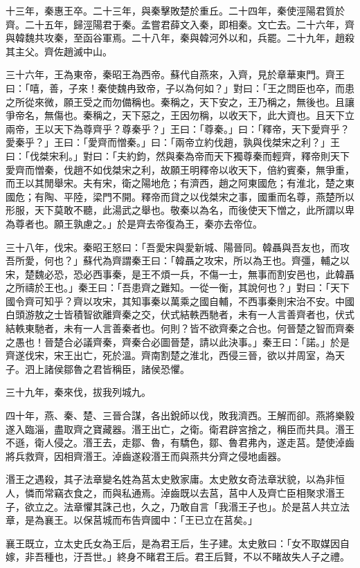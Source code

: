 \begin{pinyinscope}
十三年，秦惠王卒。二十三年，與秦擊敗楚於重丘。二十四年，秦使涇陽君質於齊。二十五年，歸涇陽君于秦。孟嘗君薛文入秦，即相秦。文亡去。二十六年，齊與韓魏共攻秦，至函谷軍焉。二十八年，秦與韓河外以和，兵罷。二十九年，趙殺其主父。齊佐趙滅中山。

三十六年，王為東帝，秦昭王為西帝。蘇代自燕來，入齊，見於章華東門。齊王曰：「嘻，善，子來！秦使魏冉致帝，子以為何如？」對曰：「王之問臣也卒，而患之所從來微，願王受之而勿備稱也。秦稱之，天下安之，王乃稱之，無後也。且讓爭帝名，無傷也。秦稱之，天下惡之，王因勿稱，以收天下，此大資也。且天下立兩帝，王以天下為尊齊乎？尊秦乎？」王曰：「尊秦。」曰：「釋帝，天下愛齊乎？愛秦乎？」王曰：「愛齊而憎秦。」曰：「兩帝立約伐趙，孰與伐桀宋之利？」王曰：「伐桀宋利。」對曰：「夫約鈞，然與秦為帝而天下獨尊秦而輕齊，釋帝則天下愛齊而憎秦，伐趙不如伐桀宋之利，故願王明釋帝以收天下，倍約賓秦，無爭重，而王以其閒舉宋。夫有宋，衛之陽地危；有濟西，趙之阿東國危；有淮北，楚之東國危；有陶、平陸，梁門不開。釋帝而貸之以伐桀宋之事，國重而名尊，燕楚所以形服，天下莫敢不聽，此湯武之舉也。敬秦以為名，而後使天下憎之，此所謂以卑為尊者也。願王孰慮之。」於是齊去帝復為王，秦亦去帝位。

三十八年，伐宋。秦昭王怒曰：「吾愛宋與愛新城、陽晉同。韓聶與吾友也，而攻吾所愛，何也？」蘇代為齊謂秦王曰：「韓聶之攻宋，所以為王也。齊彊，輔之以宋，楚魏必恐，恐必西事秦，是王不煩一兵，不傷一士，無事而割安邑也，此韓聶之所禱於王也。」秦王曰：「吾患齊之難知。一從一衡，其說何也？」對曰：「天下國令齊可知乎？齊以攻宋，其知事秦以萬乘之國自輔，不西事秦則宋治不安。中國白頭游敖之士皆積智欲離齊秦之交，伏式結軼西馳者，未有一人言善齊者也，伏式結軼東馳者，未有一人言善秦者也。何則？皆不欲齊秦之合也。何晉楚之智而齊秦之愚也！晉楚合必議齊秦，齊秦合必圖晉楚，請以此決事。」秦王曰：「諾。」於是齊遂伐宋，宋王出亡，死於溫。齊南割楚之淮北，西侵三晉，欲以并周室，為天子。泗上諸侯鄒魯之君皆稱臣，諸侯恐懼。

三十九年，秦來伐，拔我列城九。

四十年，燕、秦、楚、三晉合謀，各出銳師以伐，敗我濟西。王解而卻。燕將樂毅遂入臨淄，盡取齊之寶藏器。湣王出亡，之衛。衛君辟宮捨之，稱臣而共具。湣王不遜，衛人侵之。湣王去，走鄒、魯，有驕色，鄒、魯君弗內，遂走莒。楚使淖齒將兵救齊，因相齊湣王。淖齒遂殺湣王而與燕共分齊之侵地鹵器。

湣王之遇殺，其子法章變名姓為莒太史敫家庸。太史敫女奇法章狀貌，以為非恒人，憐而常竊衣食之，而與私通焉。淖齒既以去莒，莒中人及齊亡臣相聚求湣王子，欲立之。法章懼其誅己也，久之，乃敢自言「我湣王子也」。於是莒人共立法章，是為襄王。以保莒城而布告齊國中：「王已立在莒矣。」

襄王既立，立太史氏女為王后，是為君王后，生子建。太史敫曰：「女不取媒因自嫁，非吾種也，汙吾世。」終身不睹君王后。君王后賢，不以不睹故失人子之禮。


\end{pinyinscope}
